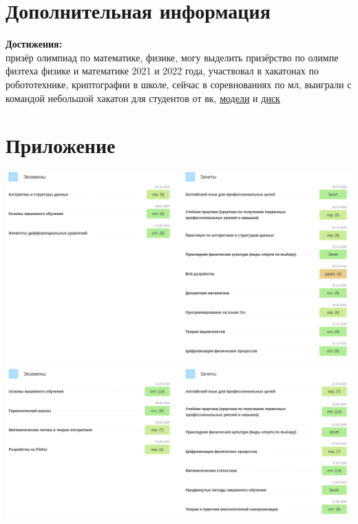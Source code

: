 \documentclass[a4paper,10pt]{article}
\begin{document}
\section*{Дополнительная информация}
\noindent
\textbf{Достижения:} \\ призёр олимпиад по математике, физике, могу выделить призёрство по олимпе физтеха физике и математике 2021 и 2022 года, участвовал в хакатонах по робототехнике, криптографии в школе, сейчас в соревнованиях по мл, выиграли с командой небольшой хакатон для студентов от вк, \href{https://github.com/Schaft-s/Hakaton}{модели} и \href{https://docs.google.com/presentation/d/1dHL0PJcekh2bE3q5G3LOQFY1H7PgTLJR/edit?usp=sharing&ouid=110979338898294675609&rtpof=true&sd=true}{диск}

\section*{Приложение}
\begin{center}
  \includegraphics[scale = 0.5]{pic1.png}
  \includegraphics[scale = 0.5]{pic2.png}
\end{center}
\end{document}
